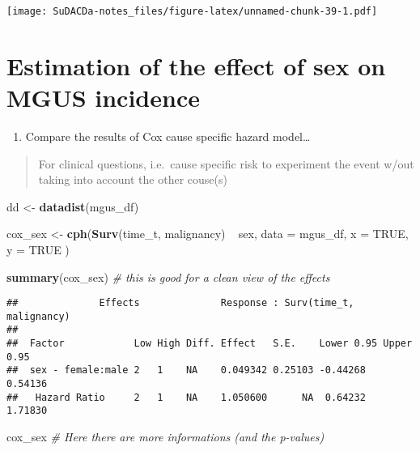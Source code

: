 \documentclass[]{book}
\newenvironment{Shaded}{\begin{snugshade}}{\end{snugshade}}
\newcommand{\KeywordTok}[1]{\textcolor[rgb]{0.13,0.29,0.53}{\textbf{{#1}}}}
\newcommand{\DataTypeTok}[1]{\textcolor[rgb]{0.13,0.29,0.53}{{#1}}}
\newcommand{\StringTok}[1]{\textcolor[rgb]{0.31,0.60,0.02}{{#1}}}
\newcommand{\CommentTok}[1]{\textcolor[rgb]{0.56,0.35,0.01}{\textit{{#1}}}}
\newcommand{\OtherTok}[1]{\textcolor[rgb]{0.56,0.35,0.01}{{#1}}}
\newcommand{\NormalTok}[1]{{#1}}
\providecommand{\tightlist}{%
  \setlength{\itemsep}{0pt}\setlength{\parskip}{0pt}}
\theoremstyle{definition}
\theoremstyle{definition}
\theoremstyle{definition}
\theoremstyle{remark}
\begin{document}
\texttt{[image: SuDACDa-notes\_files/figure-latex/unnamed-chunk-39-1.pdf]}

\section{Estimation of the effect of sex on MGUS
incidence}\label{estimation-of-the-effect-of-sex-on-mgus-incidence}

\begin{enumerate}
\def\labelenumi{\arabic{enumi}.}
\tightlist
\item
  Compare the results of Cox cause specific hazard model\ldots{}
\end{enumerate}

\begin{quote}
For clinical questions, i.e.~cause specific risk to experiment the event
w/out taking into account the other couse(s)
\end{quote}

\begin{Shaded}
\begin{Highlighting}[]
\NormalTok{dd <-}\StringTok{ }\KeywordTok{datadist}\NormalTok{(mgus_df)}

\NormalTok{cox_sex <-}\StringTok{ }\KeywordTok{cph}\NormalTok{(}\KeywordTok{Surv}\NormalTok{(time_t, malignancy) ~}\StringTok{ }\NormalTok{sex,}
  \DataTypeTok{data =} \NormalTok{mgus_df,}
  \DataTypeTok{x    =} \OtherTok{TRUE}\NormalTok{,}
  \DataTypeTok{y    =} \OtherTok{TRUE}
\NormalTok{)}

\KeywordTok{summary}\NormalTok{(cox_sex)                  }\CommentTok{# this is good for a clean view of the effects}
\end{Highlighting}
\end{Shaded}

\begin{verbatim}
##              Effects              Response : Surv(time_t, malignancy) 
## 
##  Factor            Low High Diff. Effect   S.E.    Lower 0.95 Upper 0.95
##  sex - female:male 2   1    NA    0.049342 0.25103 -0.44268   0.54136   
##   Hazard Ratio     2   1    NA    1.050600      NA  0.64232   1.71830
\end{verbatim}

\begin{Shaded}
\begin{Highlighting}[]
\NormalTok{cox_sex                    }\CommentTok{# Here there are more informations (and the p-values)}
\end{Highlighting}
\end{Shaded}
\end{document}
